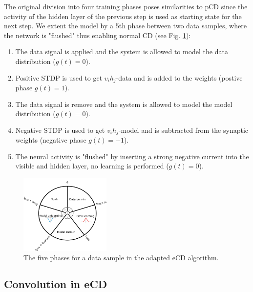 The original division into four training phases poses similarities to pCD since the activity of the hidden layer of the previous step is used as starting state for the next step.
We extent the model by a 5th phase between two data samples, where the network is "flushed" thus enabling normal CD  (see Fig. \ref{fig:ecd5}):

\begin{enumerate}
\item The data signal is applied and the system is allowed to model the data distribution ($g(t)=0$).
\item Positive STDP is used to get $v_i h_j$-data and is added to the weights (postive phase $g(t)=1$).
\item The data signal is remove and the system is allowed to model the model distribution ($g(t)=0$).
\item Negative STDP is used to get $v_i h_j$-model and is subtracted from the synaptic weights (negative phase $g(t)=-1$).
\item The neural activity is "flushed" by inserting a strong negative current into the visible and hidden layer, no learning is performed ($g(t)=0$).
\end{enumerate}

\begin{figure}
	\centering
   	\includegraphics[width=0.4\textwidth]{imgs/eCD_5phases.png} 
    \caption{The five phases for a data sample in the adapted eCD algorithm. }
	\label{fig:ecd5}
\end{figure}

 
\subsection{Convolution in eCD} \label{c:ecdconv}

